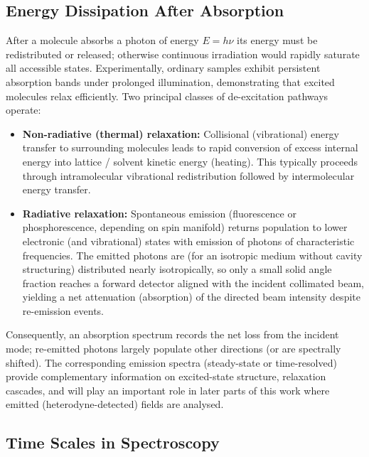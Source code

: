 
\subsection{Energy Dissipation After Absorption}
\label{subsec:energy_dissipation}

\noindent After a molecule absorbs a photon of energy $E = h\nu$ its energy must be redistributed or released; otherwise continuous irradiation would rapidly saturate all accessible states. Experimentally, ordinary samples exhibit persistent absorption bands under prolonged illumination, demonstrating that excited molecules relax efficiently. Two principal classes of de-excitation pathways operate:
\begin{itemize}
	\item \textbf{Non-radiative (thermal) relaxation:} Collisional (vibrational) energy transfer to surrounding molecules leads to rapid conversion of excess internal energy into lattice / solvent kinetic energy (heating). This typically proceeds through intramolecular vibrational redistribution followed by intermolecular energy transfer.
	\item \textbf{Radiative relaxation:} Spontaneous emission (fluorescence or phosphorescence, depending on spin manifold) returns population to lower electronic (and vibrational) states with emission of photons of characteristic frequencies. The emitted photons are (for an isotropic medium without cavity structuring) distributed nearly isotropically, so only a small solid angle fraction reaches a forward detector aligned with the incident collimated beam, yielding a net attenuation (absorption) of the directed beam intensity despite re-emission events.
\end{itemize}

\noindent Consequently, an absorption spectrum records the net loss from the incident mode; re-emitted photons largely populate other directions (or are spectrally shifted). The corresponding emission spectra (steady-state or time-resolved) provide complementary information on excited-state structure, relaxation cascades, and will play an important role in later parts of this work where emitted (heterodyne-detected) fields are analysed.


\subsection{Time Scales in Spectroscopy}
\label{subsec:time_scales}

